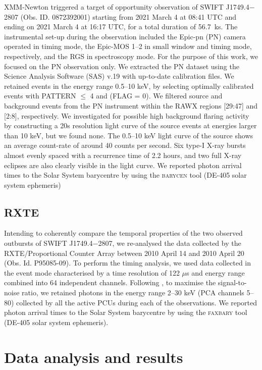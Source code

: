\documentclass[fleqn,usenatbib]{mnras}
\newcommand{\swiftj}{SWIFT J1749.4$-$2807}
\newcommand{\rxte}{RXTE}
\begin{document}
XMM-Newton \citep{Jansen2001} triggered a target of opportunity observation of \swiftj{} (Obs. ID. 0872392001) starting from 2021 March 4 at 08:41 UTC and ending on 2021 March 4 at 16:17 UTC, for a total duration of 56.7~ks. 
The instrumental set-up during the observation included the Epic-pn (PN) camera operated in timing mode, the Epic-MOS 1--2 in small window and timing mode, respectively, and the RGS in spectroscopy mode. For the purpose of this work, we focused on the PN observation only. We extracted the PN dataset using the Science Analysis Software (SAS) v.19 with up-to-date calibration files. We retained events in the energy range 0.5–10 keV, by selecting optimally calibrated events with \textsc{PATTERN $\leq$ 4} and \textsc{(FLAG = 0)}. We filtered source and background events from the PN instrument within the RAWX regions [29:47] and [2:8], respectively. We investigated for possible high background flaring activity by constructing a 20s resolution light curve of the source events at energies larger than 10 keV, but we found none.  
The 0.5--10 keV light curve of the source shows an average count-rate of around 40 counts per second. Six type-I X-ray bursts almost evenly spaced with a recurrence time of 2.2 hours, and two full X-ray eclipses are also clearly visible in the light curve. We reported photon arrival times to the Solar System barycentre by using the \textsc{barycen} tool (DE-405 solar system ephemeris)


\subsection{RXTE}


Intending to coherently compare the temporal properties of the two observed outbursts of \swiftj{}, we re-analysed the data collected by the \rxte{}/Proportional Counter Array \citep[PCA; 2--60 keV;][]{Jahoda:2006uf} between 2010 April 14 and 2010 April 20 (Obs. Id. P95085-09). To perform the timing analysis, we used data collected in the event mode characterised by a time resolution of 122 $\mu$s and energy range combined into 64 independent channels. Following \citet{Markwardt:2010tl}, to maximise the signal-to-noise ratio, we retained photons in the energy range 2--30 keV (PCA channels 5--80) collected by all the active PCUs during each of the observations. We reported photon arrival times to the Solar System barycentre by using the \textsc{faxbary} tool (DE-405 solar system ephemeris).


\section{Data analysis and results}
\label{sec:results}
\end{document}
